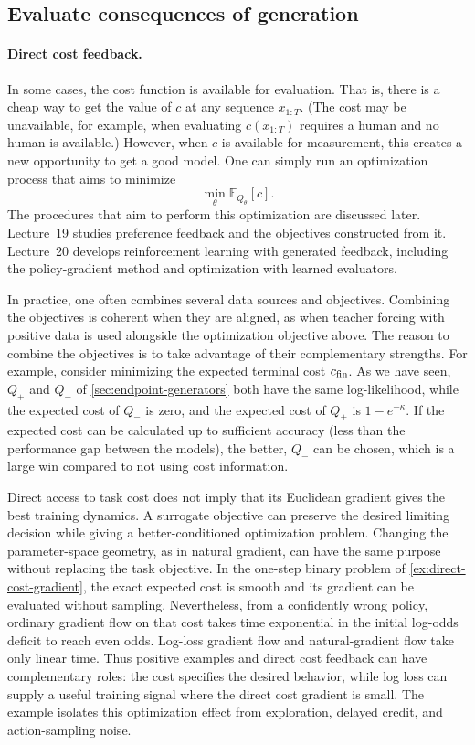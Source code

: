 \documentclass[11pt,twoside]{article}
\newcommand{\E}{\mathbb E}
\theoremstyle{definition}
\theoremstyle{remark}
\begin{document}
\subsection{Evaluate consequences of generation}
\label{sec:generation-objectives}

\paragraph{Direct cost feedback.}
In some cases, the cost function is available for evaluation.
That is, there is a cheap way to get the value of $c$ at any sequence $x_{1:T}$.
(The cost may be unavailable, for example, when evaluating
$c(x_{1:T})$ requires a human and no human is available.)
However, when $c$ is available for measurement, this creates a new opportunity
to get a good model. One can simply run an optimization process
that aims to minimize
\begin{equation}
 \min_\theta\E_{Q_\theta}[c].
 \label{eq:direct-cost}
\end{equation}
The procedures that aim to perform this optimization are discussed later.
Lecture~19 studies preference feedback and the objectives constructed from it.
Lecture~20 develops reinforcement learning with generated feedback, including
the policy-gradient method and optimization with learned evaluators.

In practice, one often combines several data sources and objectives.
Combining the objectives is coherent when they are aligned, as when teacher
forcing with positive data is used alongside the optimization objective above.
The reason to combine the objectives is to take advantage
of their complementary strengths.
For example, consider minimizing the expected terminal
cost $c_{\rm fin}$. As we have seen, $Q_+$ and $Q_-$ of \cref{sec:endpoint-generators} both have the same
log-likelihood, while the expected cost of $Q_-$ is zero, and the expected cost of $Q_+$ is \(1-e^{-\kappa}\).
If the expected cost can be calculated up to sufficient accuracy (less than the performance gap
between the models), the better, $Q_-$ can be chosen, which is a large win compared to not using cost information.

Direct access to task cost does not imply that its Euclidean gradient gives the
best training dynamics. A surrogate objective can preserve the desired
limiting decision while giving a better-conditioned optimization problem.
Changing the parameter-space geometry, as in natural gradient, can have the
same purpose without replacing the task objective. In the one-step binary
problem of \cref{ex:direct-cost-gradient}, the exact expected cost is smooth
and its gradient can be evaluated without sampling. Nevertheless, from a
confidently wrong policy, ordinary gradient flow on that cost takes time
exponential in the initial log-odds deficit to reach even odds. Log-loss
gradient flow and natural-gradient flow take only linear time. Thus positive
examples and direct cost feedback can have complementary roles: the cost
specifies the desired behavior, while log loss can supply a useful training
signal where the direct cost gradient is small. The example isolates this
optimization effect from exploration, delayed credit, and action-sampling
noise.
\end{document}
